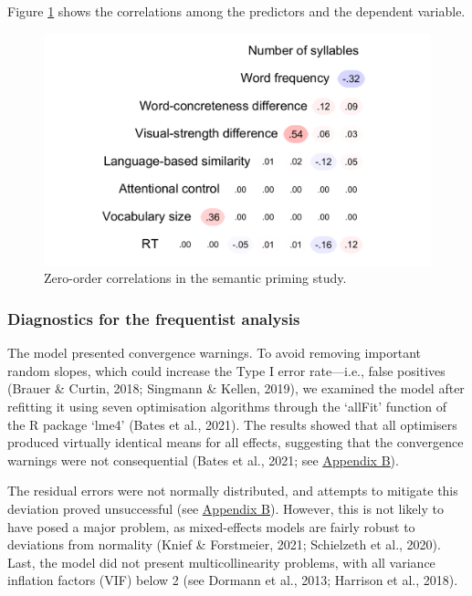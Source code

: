 \documentclass[
  12pt,
  man,floatsintext]{apa7}
\begin{document}
Figure \ref{fig:semanticpriming-correlations} shows the correlations among the predictors and the dependent variable.

\begin{figure}

{\centering \includegraphics[width=0.65\linewidth]{thesis-core_files/figure-latex/semanticpriming-correlations-1} 

}

\caption{Zero-order correlations in the semantic priming study.}\label{fig:semanticpriming-correlations}
\end{figure}

\hypertarget{diagnostics-for-the-frequentist-analysis}{%
\subsubsection{Diagnostics for the frequentist analysis}\label{diagnostics-for-the-frequentist-analysis}}

The model presented convergence warnings. To avoid removing important random slopes, which could increase the Type I error rate---i.e., false positives (Brauer \& Curtin, 2018; Singmann \& Kellen, 2019), we examined the model after refitting it using seven optimisation algorithms through the `allFit' function of the R package `lme4' (Bates et al., 2021). The results showed that all optimisers produced virtually identical means for all effects, suggesting that the convergence warnings were not consequential (Bates et al., 2021; see \protect\hyperlink{appendix-B-frequentist-analysis-diagnostics}{\underline{Appendix B}}).

The residual errors were not normally distributed, and attempts to mitigate this deviation proved unsuccessful (see \protect\hyperlink{appendix-B-frequentist-analysis-diagnostics}{\underline{Appendix B}}). However, this is not likely to have posed a major problem, as mixed-effects models are fairly robust to deviations from normality (Knief \& Forstmeier, 2021; Schielzeth et al., 2020). Last, the model did not present multicollinearity problems, with all variance inflation factors (VIF) below 2 (see Dormann et al., 2013; Harrison et al., 2018).
\end{document}
